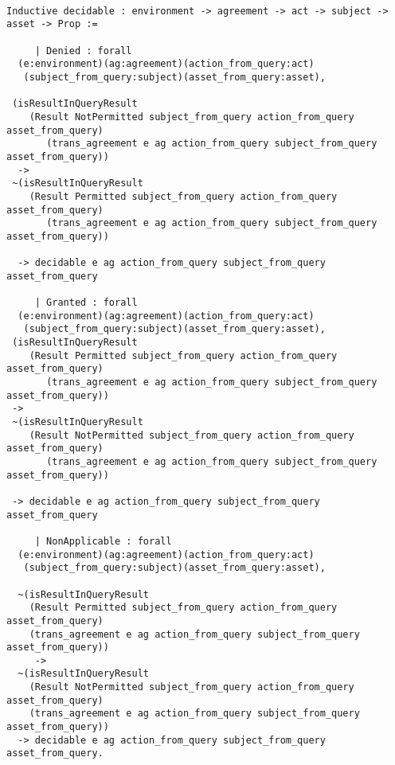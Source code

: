 \begin{lstlisting}

Inductive decidable : environment -> agreement -> act -> subject -> asset -> Prop :=

     | Denied : forall
  (e:environment)(ag:agreement)(action_from_query:act)
   (subject_from_query:subject)(asset_from_query:asset), 

 (isResultInQueryResult 
    (Result NotPermitted subject_from_query action_from_query asset_from_query)
       (trans_agreement e ag action_from_query subject_from_query asset_from_query)) 
  ->
 ~(isResultInQueryResult 
    (Result Permitted subject_from_query action_from_query asset_from_query)
       (trans_agreement e ag action_from_query subject_from_query asset_from_query)) 

  -> decidable e ag action_from_query subject_from_query asset_from_query

     | Granted : forall
  (e:environment)(ag:agreement)(action_from_query:act)
   (subject_from_query:subject)(asset_from_query:asset), 
 (isResultInQueryResult 
    (Result Permitted subject_from_query action_from_query asset_from_query)
       (trans_agreement e ag action_from_query subject_from_query asset_from_query)) 
 ->
 ~(isResultInQueryResult 
    (Result NotPermitted subject_from_query action_from_query asset_from_query)
       (trans_agreement e ag action_from_query subject_from_query asset_from_query)) 
 
 -> decidable e ag action_from_query subject_from_query asset_from_query

     | NonApplicable : forall
  (e:environment)(ag:agreement)(action_from_query:act)
   (subject_from_query:subject)(asset_from_query:asset), 

  ~(isResultInQueryResult 
    (Result Permitted subject_from_query action_from_query asset_from_query)
    (trans_agreement e ag action_from_query subject_from_query asset_from_query)) 
     ->
  ~(isResultInQueryResult 
    (Result NotPermitted subject_from_query action_from_query asset_from_query)
    (trans_agreement e ag action_from_query subject_from_query asset_from_query)) 
  -> decidable e ag action_from_query subject_from_query asset_from_query.
\end{lstlisting}


